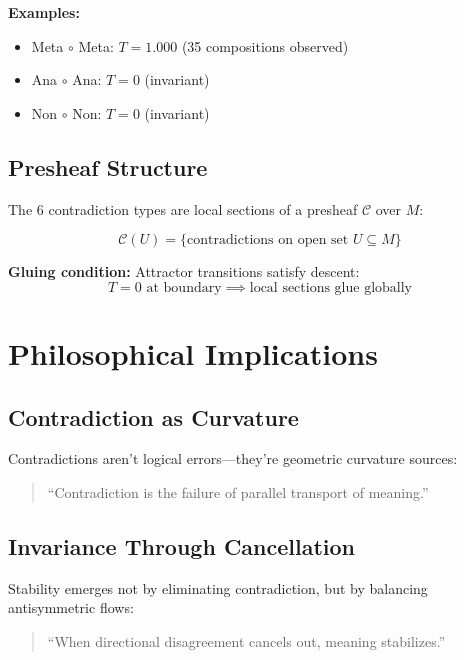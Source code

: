 \documentclass{article}
\begin{document}
\textbf{Examples:}
\begin{itemize}
    \item Meta $\circ$ Meta: $T = 1.000$ (35 compositions observed)
    \item Ana $\circ$ Ana: $T = 0$ (invariant)
    \item Non $\circ$ Non: $T = 0$ (invariant)
\end{itemize}

\subsection{Presheaf Structure}

The 6 contradiction types are local sections of a presheaf $\mathcal{C}$ over $M$:

\begin{equation}
\mathcal{C}(U) = \{\text{contradictions on open set } U \subseteq M\}
\end{equation}

\textbf{Gluing condition:} Attractor transitions satisfy descent:
\begin{equation}
T = 0 \text{ at boundary} \implies \text{local sections glue globally}
\end{equation}

\section{Philosophical Implications}

\subsection{Contradiction as Curvature}

Contradictions aren't logical errors—they're geometric curvature sources:

\begin{quote}
``Contradiction is the failure of parallel transport of meaning.''
\end{quote}

\subsection{Invariance Through Cancellation}

Stability emerges not by eliminating contradiction, but by balancing antisymmetric flows:

\begin{quote}
``When directional disagreement cancels out, meaning stabilizes.''
\end{quote}
\end{document}
